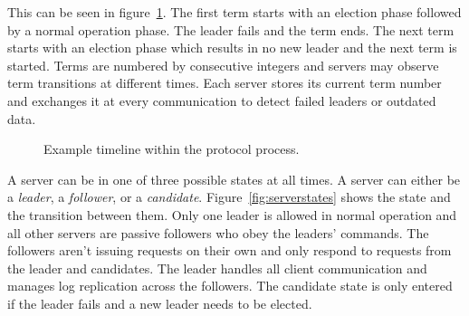 This can be seen in figure~\ref{fig:terms}. The first term starts with an
election phase followed by a normal operation phase. The leader fails and
the term ends. The next term starts with an election phase which results in no
new leader and the next term is started.
Terms are numbered by consecutive integers and servers may observe term
transitions at different times. Each server stores its current term number
and exchanges it at every communication to detect failed leaders or outdated
data.~\cite{ongaro2014search}

\begin{figure}[ht]
  \centering
  \caption{Example timeline within the protocol process.}
  \label{fig:terms}
\end{figure}

A server can be in one of three possible states at all times.
A server can either be a \textit{leader}, a \textit{follower}, or a
\textit{candidate}. Figure~\ref{fig:serverstates} shows the state
and the transition between them. Only one leader is allowed in normal operation
and all other servers are passive followers who obey the leaders' commands.
The followers aren't issuing requests on their own and only respond to requests
from the leader and candidates. The leader handles all client communication
and manages log replication across the followers. The candidate state is only
entered if the leader fails and a new leader needs to be elected.~\cite{ongaro2014search}

